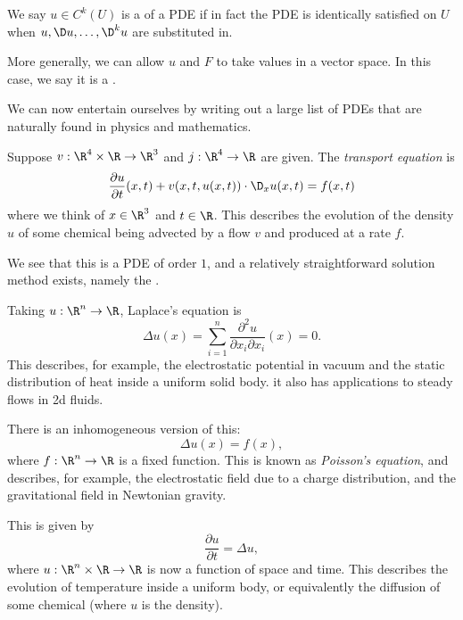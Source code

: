\documentclass[a4paper]{article}
\begin{document}
\begin{defi}
  We say $u \in C^k(U)$ is a  of a PDE if in fact the PDE is identically satisfied on $U$ when $u, \D u, \ldots, \D^k u$ are substituted in.
\end{defi}

More generally, we can allow $u$ and $F$ to take values in a vector space. In this case, we say it is a .

We can now entertain ourselves by writing out a large list of PDEs that are naturally found in physics and mathematics.
\begin{eg}
  Suppose $v: \R^4 \times \R \to \R^3$ and $j: \R^4 \to \R$ are given. The \emph{transport equation} is
  \[
    \frac{\partial u}{\partial t}(x, t) + v(x, t, u(x, t)) \cdot \D_x u(x, t) = f(x, t)
  \]
  where we think of $x \in \R^3$ and $t \in \R$. This describes the evolution of the density $u$ of some chemical being advected by a flow $v$ and produced at a rate $f$.

  We see that this is a PDE of order $1$, and a relatively straightforward solution method exists, namely the .
\end{eg}

\begin{eg}
  Taking $u: \R^n \to \R$, Laplace's equation is
  \[
    \Delta u(x) = \sum_{i = 1}^n \frac{\partial^2 u}{\partial x_i \partial x_i} (x) = 0.
  \]
  This describes, for example, the electrostatic potential in vacuum and the static distribution of heat inside a uniform solid body. it also has applications to steady flows in 2d fluids.

  There is an inhomogeneous version of this:
  \[
    \Delta u(x) = f(x),
  \]
  where $f: \R^n \to \R$ is a fixed function. This is known as \emph{Poisson's equation}, and describes, for example, the electrostatic field due to a charge distribution, and the gravitational field in Newtonian gravity.
\end{eg}

\begin{eg}
  This is given by
  \[
    \frac{\partial u}{\partial t} = \Delta u,
  \]
  where $u: \R^n \times \R \to \R$ is now a function of space and time. This describes the evolution of temperature inside a uniform body, or equivalently the diffusion of some chemical (where $u$ is the density).
\end{eg}
\end{document}
